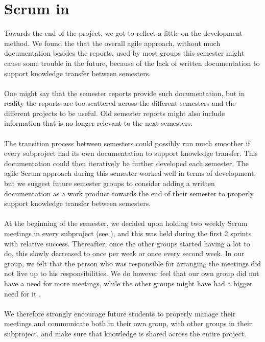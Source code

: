 
\section{Scrum in \giraf}

Towards the end of the project, we got to reflect a little on the \giraf development method. We found the that the overall agile approach, without much documentation besides the reports, used by most groups this semester might cause some trouble in the future, because of the lack of written documentation to support knowledge transfer between semesters.
\\\\
One might say that the semester reports provide such documentation, but in reality the reports are too scattered across the different semesters and the different projects to be useful. Old semester reports might also include information that is no longer relevant to the next semesters. 
\\\\
The transition process between semesters could possibly run much smoother if every subproject had its own documentation to support knowledge transfer. This documentation could then iteratively be further developed each semester. The agile Scrum approach during this semester worked well in terms of development, but we suggest future semester groups to consider adding a written documentation as a work product towards the end of their semester to properly support knowledge transfer between semesters.
\\\\ 
At the beginning of the semester, we decided upon holding two weekly Scrum meetings in every subproject (see ), and this was held during the first 2 sprints with relative success. Thereafter, once the other groups started having a lot to do, this slowly decreased to once per week or once every second week. In our group, we felt that the person who was responsible for arranging the meetings did not live up to his responsibilities.  We do however feel that our own group did not have a need for more meetings, while the other groups might have had a bigger need for it .
\\\\ 
We therefore strongly encourage future students to properly manage their meetings and communicate both in their own group, with other groups in their subproject, and make sure that knowledge is shared across the entire project. 


